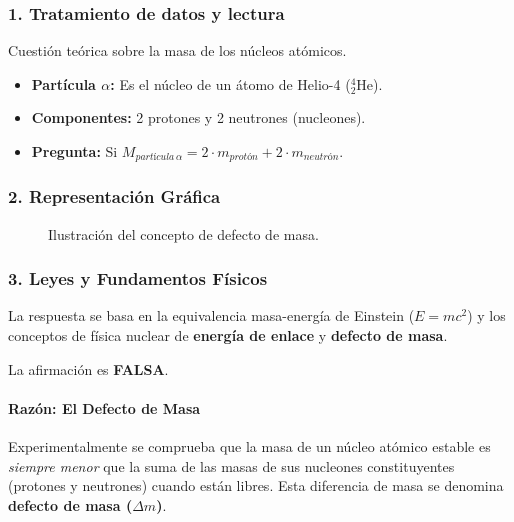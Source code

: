 \subsubsection*{1. Tratamiento de datos y lectura}
Cuestión teórica sobre la masa de los núcleos atómicos.
\begin{itemize}
    \item \textbf{Partícula $\alpha$:} Es el núcleo de un átomo de Helio-4 ($^4_2\text{He}$).
    \item \textbf{Componentes:} 2 protones y 2 neutrones (nucleones).
    \item \textbf{Pregunta:} Si $M_{partícula\,\alpha} = 2 \cdot m_{protón} + 2 \cdot m_{neutrón}$.
\end{itemize}

\subsubsection*{2. Representación Gráfica}
\begin{figure}[H]
    \centering
    \caption{Ilustración del concepto de defecto de masa.}
\end{figure}

\subsubsection*{3. Leyes y Fundamentos Físicos}
La respuesta se basa en la equivalencia masa-energía de Einstein ($E=mc^2$) y los conceptos de física nuclear de \textbf{energía de enlace} y \textbf{defecto de masa}.

La afirmación es \textbf{FALSA}.

\paragraph{Razón: El Defecto de Masa}
Experimentalmente se comprueba que la masa de un núcleo atómico estable es \textit{siempre menor} que la suma de las masas de sus nucleones constituyentes (protones y neutrones) cuando están libres. Esta diferencia de masa se denomina \textbf{defecto de masa ($\Delta m$)}.

